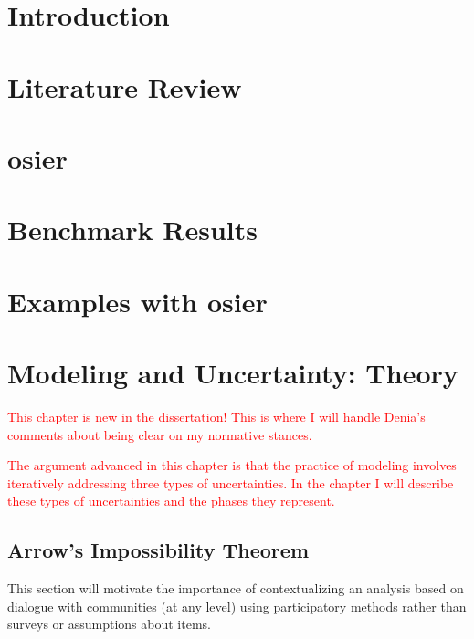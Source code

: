 \chapter{Introduction}
\label{chapter:introduction}


\chapter{Literature Review}
\label{chapter:lit-review}
% 

\chapter{\acf{osier}}
\label{chapter:osier}
% 

\chapter{Benchmark Results}
\label{chapter:benchmark-results}
% 

\chapter{Examples with \acs{osier}}
\label{chapter:examples}
% 

\chapter{Modeling and Uncertainty: Theory}

\textcolor{red}{This chapter is new in the dissertation! This is where I will handle 
Denia's comments about being clear on my normative stances.}

\textcolor{red}{The argument advanced in this chapter is that the practice of modeling
involves iteratively addressing three types of uncertainties. In the chapter I will
describe these types of uncertainties and the phases they represent.}

\section{Arrow's Impossibility Theorem}

This section will motivate the importance of contextualizing an analysis based on 
dialogue with communities (at any level) using participatory methods rather than
surveys or assumptions about items.

